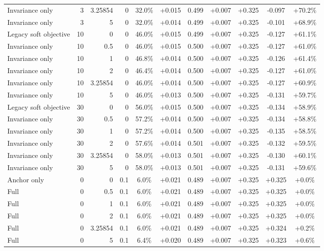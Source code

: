 \begin{table}[htbp]
\begin{tabular}{lrrrccccccc}
Invariance only & 3 & 3.25854 & 0 & 32.0\% & +0.015 & 0.499 & +0.007 & +0.325 & -0.097 & +70.2\% \\
Invariance only & 3 & 5 & 0 & 32.0\% & +0.014 & 0.499 & +0.007 & +0.325 & -0.101 & +68.9\% \\
Legacy soft objective & 10 & 0 & 0 & 46.0\% & +0.015 & 0.499 & +0.007 & +0.325 & -0.127 & +61.1\% \\
Invariance only & 10 & 0.5 & 0 & 46.0\% & +0.015 & 0.500 & +0.007 & +0.325 & -0.127 & +61.0\% \\
Invariance only & 10 & 1 & 0 & 46.8\% & +0.014 & 0.500 & +0.007 & +0.325 & -0.126 & +61.4\% \\
Invariance only & 10 & 2 & 0 & 46.4\% & +0.014 & 0.500 & +0.007 & +0.325 & -0.127 & +61.0\% \\
Invariance only & 10 & 3.25854 & 0 & 46.0\% & +0.014 & 0.500 & +0.007 & +0.325 & -0.127 & +60.9\% \\
Invariance only & 10 & 5 & 0 & 46.0\% & +0.013 & 0.500 & +0.007 & +0.325 & -0.131 & +59.7\% \\
Legacy soft objective & 30 & 0 & 0 & 56.0\% & +0.015 & 0.500 & +0.007 & +0.325 & -0.134 & +58.9\% \\
Invariance only & 30 & 0.5 & 0 & 57.2\% & +0.014 & 0.500 & +0.007 & +0.325 & -0.134 & +58.8\% \\
Invariance only & 30 & 1 & 0 & 57.2\% & +0.014 & 0.500 & +0.007 & +0.325 & -0.135 & +58.5\% \\
Invariance only & 30 & 2 & 0 & 57.6\% & +0.014 & 0.501 & +0.007 & +0.325 & -0.132 & +59.5\% \\
Invariance only & 30 & 3.25854 & 0 & 58.0\% & +0.013 & 0.501 & +0.007 & +0.325 & -0.130 & +60.1\% \\
Invariance only & 30 & 5 & 0 & 58.0\% & +0.013 & 0.501 & +0.007 & +0.325 & -0.131 & +59.6\% \\
Anchor only & 0 & 0 & 0.1 & 6.0\% & +0.021 & 0.489 & +0.007 & +0.325 & +0.325 & +0.0\% \\
Full & 0 & 0.5 & 0.1 & 6.0\% & +0.021 & 0.489 & +0.007 & +0.325 & +0.325 & +0.0\% \\
Full & 0 & 1 & 0.1 & 6.0\% & +0.021 & 0.489 & +0.007 & +0.325 & +0.325 & +0.0\% \\
Full & 0 & 2 & 0.1 & 6.0\% & +0.021 & 0.489 & +0.007 & +0.325 & +0.325 & +0.0\% \\
Full & 0 & 3.25854 & 0.1 & 6.0\% & +0.021 & 0.489 & +0.007 & +0.325 & +0.324 & +0.2\% \\
Full & 0 & 5 & 0.1 & 6.4\% & +0.020 & 0.489 & +0.007 & +0.325 & +0.323 & +0.6\% \\

\end{tabular}
\end{table}
